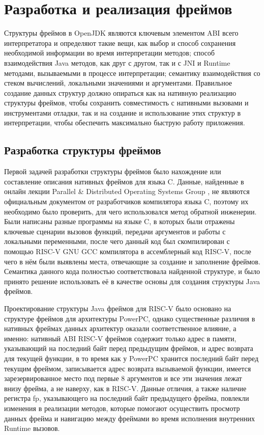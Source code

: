\section{Разработка и реализация фреймов}
Структуры фреймов в OpenJDK являются ключевым элементом ABI всего интерпретатора и определяют такие вещи, как выбор и способ сохранения необходимой информации во время интерпретации методов; способ взаимодействия Java методов, как друг с другом, так и с JNI и Runtime методами, вызываемыми в процессе интерпретации; семантику взаимодействия со стеком вычислений, локальными значениями и аргументами. Правильное создание данных структур должно опираться как на нативную реализацию структуры фреймов, чтобы сохранить совместимость с нативными вызовами и инструментами отладки, так и на создание и использование этих структур в интерпретации, чтобы обеспечить максимально быструю работу приложения.

\subsection{Разработка структуры фреймов}
Первой задачей разработки структуры фреймов было нахождение или составление описания нативных фреймов для языка C. Данные, найденные в онлайн лекции Parallel \& Distributed Operating Systems Group \cite{lecture:frames}, не являются официальным документом от разработчиков компилятора языка C, поэтому их необходимо было проверить, для чего использовался метод обратной инженерии. Были написаны разные программы на языке C, в которых были отражены ключевые сценарии вызовов функций, передачи аргументов и работы с локальными переменными, после чего данный код был скомпилирован с помощью RISC-V GNU GCC \cite{riscv:gnu} компилятора в ассемблерный код RISC-V, после чего в нём были выявлены места, отвечающие за создание и заполнение фреймов. Семантика данного кода полностью соответствовала найденной структуре, и было принято решение использовать её в качестве основы для создания структуры Java фреймов. 

Проектирование структуры Java фреймов для RISC-V было основано на структуре фреймов для архитектуры PowerPC, однако существенные различия в нативных фреймах данных архитектур оказали соответственное влияние, а именно: нативный ABI RISC-V фреймов содержит только адрес в памяти, указывающий на последний байт перед предыдущим фреймов, и адрес возврата для текущей функции, в то время как у PowerPC хранится последний байт перед текущим фреймом, записывается адрес возврата вызываемой функции, имеется зарезервированное место под первые 8 аргументов и все эти значения лежат внизу фрейма, а не наверху, как в RISC-V.
Данные отличия, а также наличие регистра fp, указывающего на последний байт предыдущего фрейма, повлекли изменения в реализации методов, которые помогают осуществить просмотр данных фрейма и навигацию между фреймами во время исполнения внутренних Runtime вызовов.

